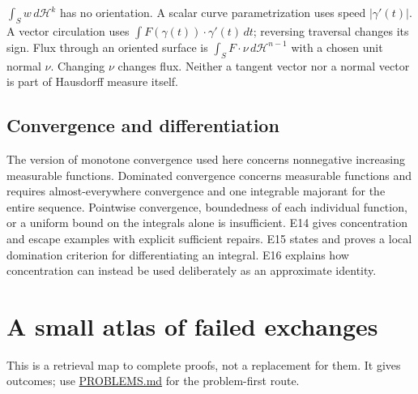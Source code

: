 \documentclass[
  11pt,
]{article}
\begin{document}
\(\int_S w\,d\mathcal H^k\) has no orientation. A scalar curve
parametrization uses speed \(|\gamma'(t)|\). A vector circulation uses
\(\int F(\gamma(t))\cdot\gamma'(t)\,dt\); reversing traversal changes
its sign. Flux through an oriented surface is
\(\int_S F\cdot\nu\,d\mathcal H^{n-1}\) with a chosen unit normal
\(\nu\). Changing \(\nu\) changes flux. Neither a tangent vector nor a
normal vector is part of Hausdorff measure itself.

\subsection{Convergence and
differentiation}\label{convergence-and-differentiation}

The version of monotone convergence used here concerns nonnegative
increasing measurable functions. Dominated convergence concerns
measurable functions and requires almost-everywhere convergence and one
integrable majorant for the entire sequence. Pointwise convergence,
boundedness of each individual function, or a uniform bound on the
integrals alone is insufficient. E14 gives concentration and escape
examples with explicit sufficient repairs. E15 states and proves a local
domination criterion for differentiating an integral. E16 explains how
concentration can instead be used deliberately as an approximate
identity.

\section{A small atlas of failed exchanges}\label{atlas}

This is a retrieval map to complete proofs, not a replacement for them.
It gives outcomes; use \hyperref[problems]{PROBLEMS.md} for the
problem-first route.
\end{document}
